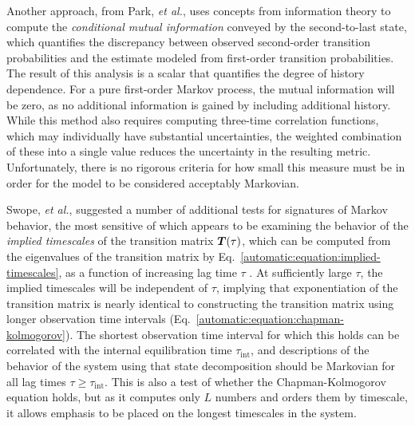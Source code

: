 Another approach, from Park, \emph{et al.}, \cite{park:2006a} uses concepts from information theory to compute the \emph{conditional mutual information} conveyed by the second-to-last state, which quantifies the discrepancy between observed second-order transition probabilities and the estimate modeled from first-order transition probabilities.
The result of this analysis is a scalar that quantifies the degree of history dependence.  
For a pure first-order Markov process, the mutual information will be zero, as no additional information is gained by including additional history.
While this method also requires computing three-time correlation functions, which may individually have substantial uncertainties, the weighted combination of these into a single value reduces the uncertainty in the resulting metric.
Unfortunately, there is no rigorous criteria for how small this measure must be in order for the model to be considered acceptably Markovian.

Swope, \emph{et al.}, \cite{swope:2004a} suggested a number of additional tests for signatures of Markov behavior, the most sensitive of which appears to be examining the behavior of the \emph{implied timescales} of the transition matrix ${\mbox{\boldmath{$T$}}}(\tau)$, which can be computed from the eigenvalues of the transition matrix by Eq.\ \ref{automatic:equation:implied-timescales}, as a function of increasing lag time $\tau$ \cite{chodera:jpcb:2006}.
At sufficiently large $\tau$, the implied timescales will be independent of $\tau$, implying that exponentiation of the transition matrix is nearly identical to constructing the transition matrix using longer observation time intervals (Eq.\ \ref{automatic:equation:chapman-kolmogorov}).
The shortest observation time interval for which this holds can be correlated with the internal equilibration time $\tau_\mathrm{int}$, and descriptions of the behavior of the system using that state decomposition should be Markovian for all lag times $\tau \ge \tau_\mathrm{int}$.
This is also a test of whether the Chapman-Kolmogorov equation holds, but as it computes only $L$ numbers and orders them by timescale, it allows emphasis to be placed on the longest timescales in the system.

